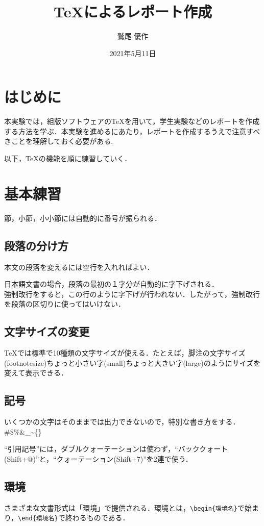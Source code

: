 \documentclass[titlepage]{jarticle}
\title{{\TeX}によるレポート作成}
\author{鷲尾 優作}
\date{2021年5月11日}
\begin{document}
\maketitle

\section{はじめに}

本実験では，組版ソフトウェアの{\TeX}を用いて，学生実験などのレポートを作成する方法を学ぶ．本実験を進めるにあたり，レポートを作成するうえで注意すべきことを理解しておく必要がある.

以下，{\TeX}の機能を順に練習していく．

\section{基本練習}

節，小節，小小節には自動的に番号が振られる．

\subsection{段落の分け方}
本文の段落を変えるには空行を入れればよい．

日本語文書の場合，段落の最初の１字分が自動的に字下げされる．\\
強制改行をすると，この行のように字下げが行われない．したがって，強制改行を段落の区切りに使ってはいけない．

\subsection{文字サイズの変更}
\label{sec:文字サイズ}
{\TeX}では標準で10種類の文字サイズが使える．たとえば，{\footnotesize 脚注の文字サイズ(footnotesize)}{\small ちょっと小さい字(small)}{\large ちょっと大きい字(large)}のようにサイズを変えて表示できる．

\subsection{記号}
いくつかの文字はそのままでは出力できないので，特別な書き方をする．\#\$\%\&\_\~{}\{\}

``引用記号''には，ダブルクォーテーションは使わず，``バッククォート(Shift+@)''と，``クォーテーション(Shift+7)''を2連で使う．

\subsection{環境}
さまざまな文書形式は「環境」で提供される．環境とは，\verb|\begin{環境名}|で始まり，\verb|\end{環境名}|で終わるものである．
\end{document}
